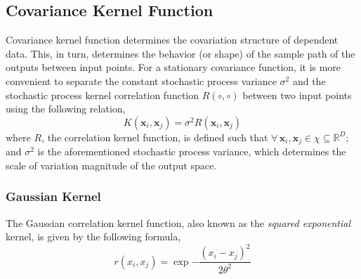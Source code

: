 



\subsection{Covariance Kernel Function}\label{sub:gp_covariance}

Covariance kernel function determines the covariation structure of dependent data.
This, in turn, determines the behavior (or shape) of the sample path of the outputs between input points.
For a stationary covariance function, it is more convenient to separate the constant stochastic process variance $\sigma^2$ and the stochastic process kernel correlation function $R(\circ,\circ)$ between two input points using the following relation,
\begin{equation}
	K (\mathbf{x}_i, \mathbf{x}_j) = \sigma^2 R(\mathbf{x}_i, \mathbf{x}_j) 
	\label{eq:cov_function}
\end{equation}
where $R$, the correlation kernel function, is defined such that $\forall \, \mathbf{x}_i, \mathbf{x}_j \in \chi \subseteq \mathbb{R}^D$;
and $\sigma^2$ is the aforementioned stochastic process variance, which determines the scale of variation magnitude of the output space.

\subsubsection{Gaussian Kernel}\label{subsub:gp_gaussian_cov}

The Gaussian correlation kernel function, also known as the \emph{squared exponential} kernel, is given by the following formula,
\begin{equation}
	r(x_i, x_j) = \exp{- \frac{(x_i - x_j)^2}{2 \theta^2}}
\label{eq:gaussian_kernel}
\end{equation}

